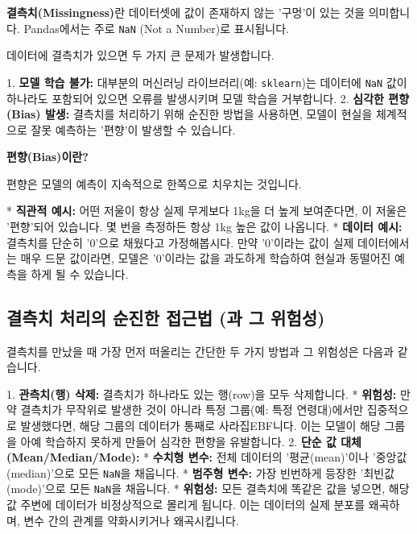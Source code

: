 \documentclass[11pt,a4paper]{book}
\theoremstyle{definition}
\begin{document}
\textbf{결측치(Missingness)}란 데이터셋에 값이 존재하지 않는 '구멍'이 있는 것을 의미합니다. Pandas에서는 주로 \texttt{NaN} (Not a Number)로 표시됩니다.

데이터에 결측치가 있으면 두 가지 큰 문제가 발생합니다.

1.  \textbf{모델 학습 불가:} 대부분의 머신러닝 라이브러리(예: \texttt{sklearn})는 데이터에 \texttt{NaN} 값이 하나라도 포함되어 있으면 오류를 발생시키며 모델 학습을 거부합니다.
2.  \textbf{심각한 편향(Bias) 발생:} 결측치를 처리하기 위해 순진한 방법을 사용하면, 모델이 현실을 체계적으로 잘못 예측하는 '편향'이 발생할 수 있습니다.

\begin{warningbox}
\textbf{편향(Bias)이란?}

    편향은 모델의 예측이 지속적으로 한쪽으로 치우치는 것입니다.

    * \textbf{직관적 예시:} 어떤 저울이 항상 실제 무게보다 1kg을 더 높게 보여준다면, 이 저울은 '편향'되어 있습니다. 몇 번을 측정하든 항상 1kg 높은 값이 나옵니다.
    * \textbf{데이터 예시:} 결측치를 단순히 '0'으로 채웠다고 가정해봅시다. 만약 '0'이라는 값이 실제 데이터에서는 매우 드문 값이라면, 모델은 '0'이라는 값을 과도하게 학습하여 현실과 동떨어진 예측을 하게 될 수 있습니다.
\end{warningbox}

\subsection{결측치 처리의 순진한 접근법 (과 그 위험성)}

결측치를 만났을 때 가장 먼저 떠올리는 간단한 두 가지 방법과 그 위험성은 다음과 같습니다.

1.  \textbf{관측치(행) 삭제:} 결측치가 하나라도 있는 행(row)을 모두 삭제합니다.
    * \textbf{위험성:} 만약 결측치가 무작위로 발생한 것이 아니라 특정 그룹(예: 특정 연령대)에서만 집중적으로 발생했다면, 해당 그룹의 데이터가 통째로 사라집EBF니다. 이는 모델이 해당 그룹을 아예 학습하지 못하게 만들어 심각한 편향을 유발합니다.
2.  \textbf{단순 값 대체 (Mean/Median/Mode):}
    * \textbf{수치형 변수:} 전체 데이터의 '평균(mean)'이나 '중앙값(median)'으로 모든 \texttt{NaN}을 채웁니다.
    * \textbf{범주형 변수:} 가장 빈번하게 등장한 '최빈값(mode)'으로 모든 \texttt{NaN}을 채웁니다.
    * \textbf{위험성:} 모든 결측치에 똑같은 값을 넣으면, 해당 값 주변에 데이터가 비정상적으로 몰리게 됩니다. 이는 데이터의 실제 분포를 왜곡하며, 변수 간의 관계를 약화시키거나 왜곡시킵니다.
\end{document}
